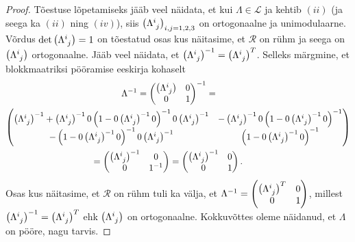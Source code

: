 \documentclass[a4paper,12pt]{article}
\theoremstyle{plain}
\theoremstyle{definition}
\numberwithin{equation}{section}
\begin{document}
\begin{proof}
Tõestuse lõpetamiseks jääb veel näidata, et kui $\Lambda \in \mathcal{L}$ ja kehtib $(ii)$ (ja seega ka $(ii)$ ning $(iv)$), siis $\left(\Lambda\indices{^i_j}\right)_{i,j = 1, 2, 3}$ on ortogonaalne ja unimodulaarne. Võrdus $\det \left(\Lambda\indices{^i_j}\right) = 1$ on tõestatud osas kus näitasime, et $\mathcal{R}$ on rühm ja seega on $\left(\Lambda\indices{^i_j}\right)$ ortogonaalne. Jääb veel näidata, et $\left(\Lambda\indices{^i_j}\right)^{-1} = \left(\Lambda\indices{^i_j}\right)^T$. Selleks märgmine, et blokkmaatriksi pööramise eeskirja kohaselt
\begin{align*}
\Lambda^{-1} = 
\begin{pmatrix}
\left(\Lambda\indices{^i_j}\right) & 0 \\
0 & 1 \\ 
\end{pmatrix}^{-1} = \qquad\qquad\qquad\qquad\qquad\qquad\qquad\quad\\
\begin{pmatrix}
\left(\Lambda\indices{^i_j}\right)^{-1} + \left(\Lambda\indices{^i_j}\right)^{-1} 0  \left(1-0 \left(\Lambda\indices{^i_j}\right)
^{-1} 0 \right)^{-1} 0 \left(\Lambda\indices{^i_j}\right)^{-1} & -\left(\Lambda\indices{^i_j}\right)^{-1} 0 \left(1 - 0 \left
(\Lambda\indices{^i_j}\right)^{-1} 0 \right)^{-1} \\
-\left(1 - 0 \left(\Lambda\indices{^i_j}\right)^{-1} 0\right)^{-1} 0 \left(\Lambda\indices{^i_j}\right)^{-1} & \left(1 - 0 \left
(\Lambda\indices{^i_j}\right)^{-1} 0 \right)^{-1} \\
\end{pmatrix} \\
 = \begin{pmatrix}
\left(\Lambda\indices{^i_j}\right)^{-1} & 0 \\
0 & 1^{-1} \\ 
\end{pmatrix} = 
\begin{pmatrix}
\left(\Lambda\indices{^i_j}\right)^{-1} & 0 \\
0 & 1 \\ 
\end{pmatrix}. \qquad\qquad\qquad\qquad\qquad\qquad
\end{align*}
Osas kus näitasime, et $\mathcal{R}$ on rühm tuli ka välja, et $\Lambda^{-1} = \begin{pmatrix} \left(\Lambda\indices{^i_j}\right)^T & 0 \\ 0 & 1 \\ \end{pmatrix}$, millest $\left(\Lambda\indices{^i_j}\right)^{-1} = \left(\Lambda\indices{^i_j}\right)^T$ ehk $\left(\Lambda\indices{^i_j}\right)$ on ortogonaalne. Kokkuvõttes oleme näidanud, et $\Lambda$ on pööre, nagu tarvis.
\end{proof}
\end{document}
